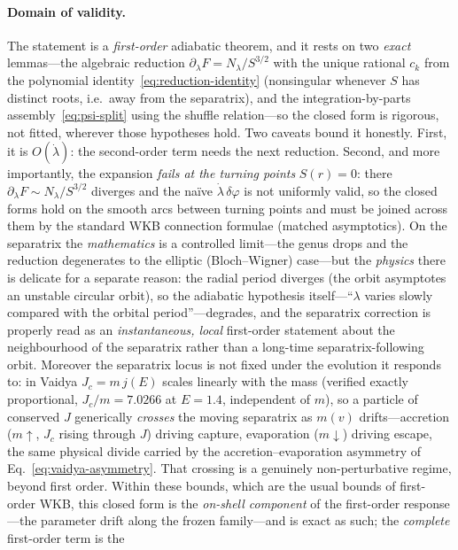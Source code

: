\documentclass[12pt]{iopart}
\newcommand{\Jc}{J_{c}}
\begin{document}
\paragraph{Domain of validity.} The statement is a \emph{first-order} adiabatic
theorem, and it rests on two \emph{exact} lemmas---the algebraic reduction
$\partial_\lambda F=N_\lambda/S^{3/2}$ with the unique rational $c_k$ from the
polynomial identity~\eqref{eq:reduction-identity} (nonsingular whenever $S$ has
distinct roots, i.e.\ away from the separatrix), and the integration-by-parts
assembly~\eqref{eq:psi-split} using the shuffle relation---so the closed form is
rigorous, not fitted, wherever those hypotheses hold. Two caveats bound it honestly.
First, it is $O(\dot\lambda)$: the second-order term needs the next reduction.
Second, and more importantly, the expansion \emph{fails at the turning points}
$S(r)=0$: there $\partial_\lambda F\sim N_\lambda/S^{3/2}$ diverges and the na\"ive
$\dot\lambda\,\delta\varphi$ is not uniformly valid, so the closed forms hold on the
smooth arcs between turning points and must be joined across them by the standard WKB
connection formulae (matched asymptotics). On the separatrix the \emph{mathematics}
is a controlled limit---the genus drops and the reduction degenerates to the elliptic
(Bloch--Wigner) case---but the \emph{physics} there is delicate for a separate reason:
the radial period diverges (the orbit asymptotes an unstable circular orbit), so the
adiabatic hypothesis itself---``$\lambda$ varies slowly compared with the orbital
period''---degrades, and the separatrix correction is properly read as an
\emph{instantaneous, local} first-order statement about the neighbourhood of the
separatrix rather than a long-time separatrix-following orbit. Moreover the separatrix
locus is not fixed under the evolution it responds to: in Vaidya
$\Jc=m\,j(E)$ scales linearly with the mass (verified exactly proportional,
$\Jc/m=7.0266$ at $E=1.4$, independent of $m$), so a particle of conserved $J$
generically \emph{crosses} the moving separatrix as $m(v)$ drifts---accretion
($m\!\uparrow$, $\Jc$ rising through $J$) driving capture, evaporation
($m\!\downarrow$) driving escape, the same physical divide carried by the
accretion--evaporation asymmetry of Eq.~\eqref{eq:vaidya-asymmetry}. That crossing is
a genuinely non-perturbative regime, beyond first order. Within these bounds, which
are the usual bounds of first-order WKB, this closed form is the \emph{on-shell
component} of the first-order response---the parameter drift along the frozen
family---and is exact as such; the \emph{complete} first-order term is the
\end{document}
